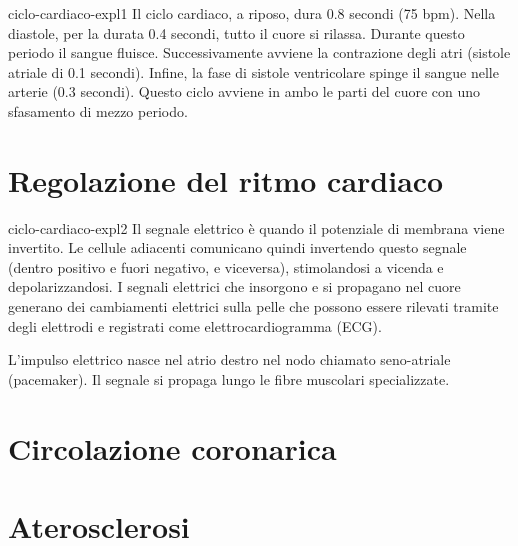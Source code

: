 \documentclass[preview]{standalone}
\begin{document}
\begin{snippet}{ciclo-cardiaco-expl1}
    Il ciclo cardiaco, a riposo, dura 0.8 secondi (75 bpm).
    Nella diastole, per la durata 0.4 secondi, tutto il cuore si rilassa.
    Durante questo periodo il sangue fluisce.
    Successivamente avviene la contrazione degli atri (sistole atriale di 0.1 secondi).
    Infine, la fase di sistole ventricolare spinge il sangue nelle arterie (0.3 secondi).
    Questo ciclo avviene in ambo le parti del cuore con uno sfasamento di mezzo periodo.
\end{snippet}

\section{Regolazione del ritmo cardiaco}

\begin{snippet}{ciclo-cardiaco-expl2}
    Il segnale elettrico è quando il potenziale di membrana viene invertito.
    Le cellule adiacenti comunicano quindi invertendo questo segnale (dentro positivo e fuori negativo, e viceversa),
    stimolandosi a vicenda e depolarizzandosi.
    I segnali elettrici che insorgono e si propagano nel cuore generano dei
    cambiamenti elettrici sulla pelle che possono essere rilevati tramite degli
    elettrodi e registrati come elettrocardiogramma (ECG).
    
    L'impulso elettrico nasce nel atrio destro nel nodo chiamato seno-atriale (pacemaker).
    Il segnale si propaga lungo le fibre muscolari specializzate.
    
\end{snippet}


\section{Circolazione coronarica}



\section{Aterosclerosi}
\end{document}
